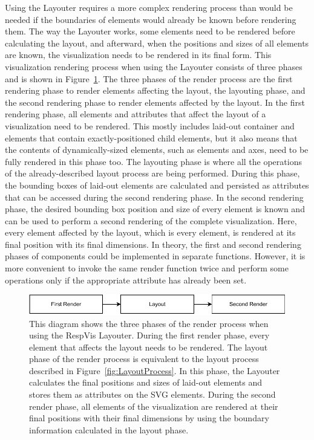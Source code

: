 Using the Layouter requires a more complex rendering process than would be needed if the boundaries of elements would already be known before rendering them.
The way the Layouter works, some elements need to be rendered before calculating the layout, and afterward, when the positions and sizes of all elements are known, the visualization needs to be rendered in its final form. 
This visualization rendering process when using the Layouter consists of three phases and is shown in Figure~\ref{fig:RenderProcess}.
The three phases of the render process are the first rendering phase to render elements affecting the layout, the layouting phase, and the second rendering phase to render elements affected by the layout.
In the first rendering phase, all elements and attributes that affect the layout of a visualization need to be rendered.
This mostly includes laid-out container  and  elements that contain exactly-positioned child elements, but it also means that the contents of dynamically-sized elements, such as  elements and axes, need to be fully rendered in this phase too.
The layouting phase is where all the operations of the already-described layout process are being performed.
During this phase, the bounding boxes of laid-out elements are calculated and persisted as attributes that can be accessed during the second rendering phase.
In the second rendering phase, the desired bounding box position and size of every element is known and can be used to perform a second rendering of the complete visualization.
Here, every element affected by the layout, which is every element, is rendered at its final position with its final dimensions.
In theory, the first and second rendering phases of components could be implemented in separate functions.
However, it is more convenient to invoke the same render function twice and perform some operations only if the appropriate  attribute has already been set.


\begin{figure}[tp]
\centering
\includegraphics[keepaspectratio,width=\linewidth,height=\fullh]{diagrams/respvis-render-process.pdf}
\caption[Render Process When Using the Layouter]{
  This diagram shows the three phases of the render process when using the RespVis Layouter. 
  During the first render phase, every element that affects the layout needs to be rendered.
  The layout phase of the render process is equivalent to the layout process described in Figure~\ref{fig:LayoutProcess}.
  In this phase, the Layouter calculates the final positions and sizes of laid-out elements and stores them as attributes on the SVG elements.
  During the second render phase, all elements of the visualization are rendered at their final positions with their final dimensions by using the boundary information calculated in the layout phase.
}
\label{fig:RenderProcess}
\end{figure}


